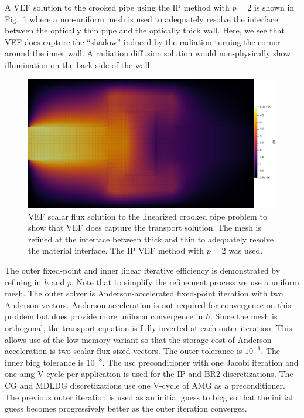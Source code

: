 \documentclass[../doc.tex]{subfiles}
\begin{document}
A VEF solution to the crooked pipe using the IP method with $p=2$ is shown in Fig.~\ref{dgvef:cp_sol} where a non-uniform mesh is used to adequately resolve the interface between the optically thin pipe and the optically thick wall. Here, we see that VEF does capture the ``shadow'' induced by the radiation turning the corner around the inner wall. A radiation diffusion solution would non-physically show illumination on the back side of the wall.
\begin{figure}
\centering
\includegraphics[width=.65\textwidth]{data/img/cp.png}
\caption{VEF scalar flux solution to the linearized crooked pipe problem to show that VEF does capture the transport solution. The mesh is refined at the interface between thick and thin to adequately resolve the material interface. The IP VEF method with $p=2$ was used.}
\label{dgvef:cp_sol}
\end{figure}

The outer fixed-point and inner linear iterative efficiency is demonstrated by refining in $h$ and $p$. Note that to simplify the refinement process we use a uniform mesh. The outer solver is Anderson-accelerated fixed-point iteration with two Anderson vectors. Anderson acceleration is not required for convergence on this problem but does provide more uniform convergence in $h$. Since the mesh is orthogonal, the transport equation is fully inverted at each outer iteration. This allows use of the low memory variant so that the storage cost of Anderson acceleration is two scalar flux-sized vectors. The outer tolerance is $10^{-6}$. The inner \gls{bicg} tolerance is $10^{-8}$. The \gls{usc} preconditioner with one Jacobi iteration and one \gls{amg} V-cycle per application is used for the IP and BR2 discretizations. The CG and MDLDG discretizations use one V-cycle of AMG as a preconditioner. The previous outer iteration is used as an initial guess to \gls{bicg} so that the initial guess becomes progressively better as the outer iteration converges. 
\end{document}
